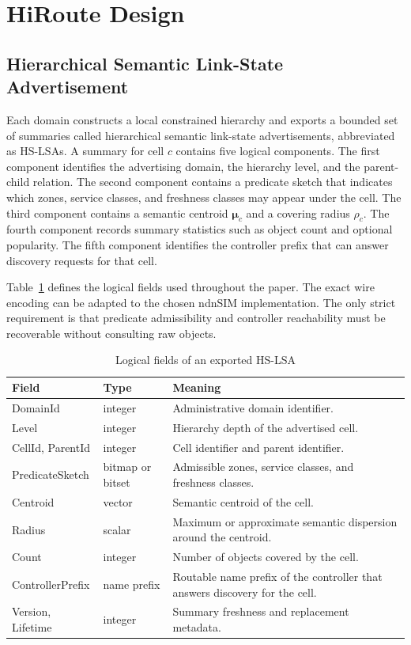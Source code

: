 \documentclass[journal]{IEEEtran}
\newcommand{\hslsa}{HS-LSA}
\newcommand{\vect}[1]{\boldsymbol{#1}}
\begin{document}
\section{HiRoute Design}

\subsection{Hierarchical Semantic Link-State Advertisement}

Each domain constructs a local constrained hierarchy and exports a bounded set of summaries called hierarchical semantic link-state advertisements, abbreviated as \hslsa{}s. A summary for cell $c$ contains five logical components. The first component identifies the advertising domain, the hierarchy level, and the parent-child relation. The second component contains a predicate sketch that indicates which zones, service classes, and freshness classes may appear under the cell. The third component contains a semantic centroid $\vect{\mu}_c$ and a covering radius $\rho_c$. The fourth component records summary statistics such as object count and optional popularity. The fifth component identifies the controller prefix that can answer discovery requests for that cell.

Table~\ref{tab:hslsa} defines the logical fields used throughout the paper. The exact wire encoding can be adapted to the chosen ndnSIM implementation. The only strict requirement is that predicate admissibility and controller reachability must be recoverable without consulting raw objects.

\begin{table}[t]
\caption{Logical fields of an exported \hslsa{}}
\label{tab:hslsa}
\centering
\begin{tabularx}{\columnwidth}{@{}>{\raggedright\arraybackslash}p{1.9cm} >{\raggedright\arraybackslash}p{1.2cm} X@{}}
\toprule
Field & Type & Meaning \\
\midrule
DomainId & integer & Administrative domain identifier. \\
Level & integer & Hierarchy depth of the advertised cell. \\
CellId, ParentId & integer & Cell identifier and parent identifier. \\
PredicateSketch & bitmap or bitset & Admissible zones, service classes, and freshness classes. \\
Centroid & vector & Semantic centroid of the cell. \\
Radius & scalar & Maximum or approximate semantic dispersion around the centroid. \\
Count & integer & Number of objects covered by the cell. \\
ControllerPrefix & name prefix & Routable name prefix of the controller that answers discovery for the cell. \\
Version, Lifetime & integer & Summary freshness and replacement metadata. \\
\bottomrule
\end{tabularx}
\end{table}
\end{document}
